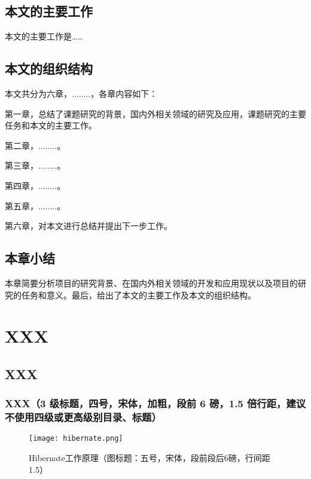 \section{本文的主要工作}
本文的主要工作是……

\section{本文的组织结构}
本文共分为六章，........，各章内容如下：

第一章，总结了课题研究的背景，国内外相关领域的研究及应用，课题研究的主要任务和本文的主要工作。

第二章，........。

第三章，........。

第四章，........。

第五章，........。

第六章，对本文进行总结并提出下一步工作。

\section{本章小结}
本章简要分析项目的研究背景、在国内外相关领域的开发和应用现状以及项目的研究的任务和意义。最后，给出了本文的主要工作及本文的组织结构。

\chapter{XXX}
\section{XXX}
\subsection{XXX（3 级标题，四号，宋体，加粗，段前 6 磅，1.5 倍行距，建议不使用四级或更高级别目录、标题）}

\begin{figure}[hbp]
  \centering
  \texttt{[image: hibernate.png]}
  \caption{Hibernate工作原理（图标题：五号，宋体，段前段后6磅，行间距1.5）}\label{fig:hibernate}
  \vspace{\baselineskip}
\end{figure}
\clearpage

